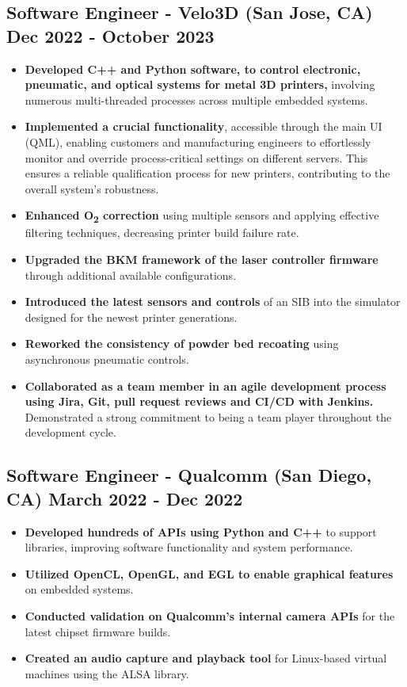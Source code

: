 \documentclass[]{article}
\begin{document}
\vspace{1ex}

\subsection{{\large{Software Engineer - Velo3D} (San Jose, CA) \hfill {\small{Dec 2022 - October 2023}}}}

\begin{itemize}
    \item \textbf{Developed C++ and Python software, to control electronic, pneumatic, and optical systems for metal 3D printers,} involving numerous multi-threaded processes across multiple embedded systems.
    \item \textbf{Implemented a crucial functionality}, accessible through the main UI (QML), enabling customers and manufacturing engineers to effortlessly monitor and override process-critical settings on different servers. 
    This ensures a reliable qualification process for new printers, contributing to the overall system's robustness.
    \item \textbf{Enhanced O\textsubscript{2} correction} using multiple sensors and applying effective filtering techniques, decreasing printer build failure rate.
    \item \textbf{Upgraded the BKM framework of the laser controller firmware} through additional available configurations.
    \item \textbf{Introduced the latest sensors and controls} of an SIB into the simulator designed for the newest printer generations.
    \item \textbf{Reworked the consistency of powder bed recoating} using asynchronous pneumatic controls.
    \item \textbf{Collaborated as a team member in an agile development process using Jira, Git, pull request reviews and CI/CD with Jenkins.} Demonstrated a strong commitment to being a team player throughout the development cycle.
\end{itemize}

\vspace{2ex}

\subsection{{\large{Software Engineer - Qualcomm} (San Diego, CA) \hfill{\small{March 2022 - Dec 2022}}}}

\begin{itemize}
    \item \textbf{Developed hundreds of APIs using Python and C++} to support libraries, improving software functionality and system performance.
    \item \textbf{Utilized OpenCL, OpenGL, and EGL to enable graphical features} on embedded systems.
    \item \textbf{Conducted validation on Qualcomm's internal camera APIs} for the latest chipset firmware builds. 
    \item \textbf{Created an audio capture and playback tool} for Linux-based virtual machines using the ALSA library.
\end{itemize}
\end{document}
